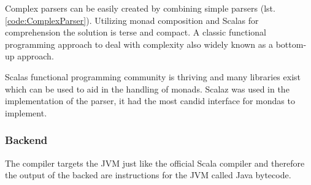 \documentclass{VUMIFPSbakalaurinis}
\begin{document}
\noindent
\begin{minipage}{.45\textwidth}
  
\end{minipage}\hfill
\begin{minipage}{.45\textwidth}
  
\end{minipage}

Complex parsers can be easily created by combining simple parsers (lst. \ref{code:ComplexParser}).
Utilizing monad composition and Scalas for comprehension the solution is terse and compact.
A classic functional programming approach to deal with complexity also widely known as a bottom-up approach.

Scalas functional programming community is thriving and many libraries exist which can be used to aid in the handling of monads.
Scalaz \cite{scalaz} was used in the implementation of the parser, it had the most candid interface for mondas to implement.




%

\subsubsection{Backend}

The compiler targets the JVM just like the official Scala compiler and therefore the output of the backed are instructions for the JVM called Java bytecode.
\end{document}
